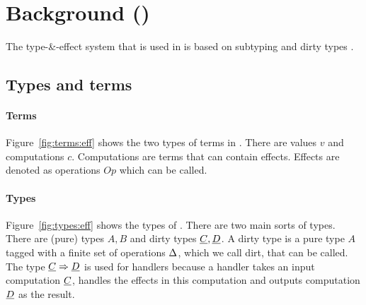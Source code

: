 \documentclass[sigplan,10pt]{acmart}\settopmatter{printfolios=true}
\begin{document}
\section{Background (\eff)}
The type-\&-effect system that is used in \eff is based on subtyping and dirty types \cite{effectsystem}.

\subsection{Types and terms}

\paragraph{Terms}
Figure~\ref{fig:terms:eff} shows the two types of terms in \eff. There are values $v$ and computations $c$. Computations are terms that can contain effects. Effects are denoted as operations $Op$ which can be called.

\paragraph{Types}
Figure~\ref{fig:types:eff} shows the types of \eff. There are two main sorts of types. There are (pure) types $A, B$ and dirty types $\underline{C}, \underline{D}$. A dirty type is a pure type $A$ tagged with a finite set of operations $\Delta$, which we call dirt, that can be called. The type $\underline{C} \Rightarrow \underline{D}$ is used for handlers because a handler takes an input computation $\underline{C}$, handles the effects in this computation and outputs computation $\underline{D}$ as the result.
\end{document}
